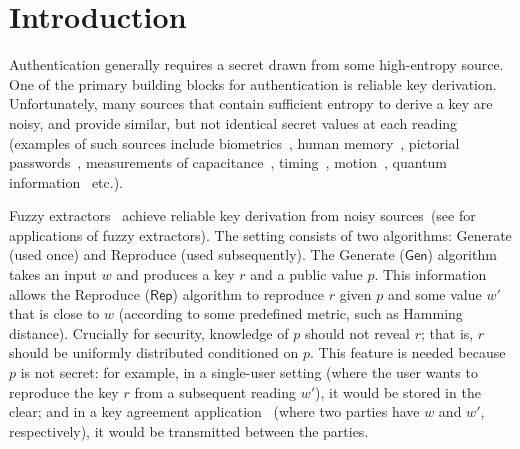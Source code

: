 \documentclass[11pt]{article}
\newcommand{\class}[1]{{\ensuremath{\mathsf{#1}}}}
\newcommand{\gen}{\ensuremath{\class{Gen}}\xspace}
\newcommand{\rep}{\ensuremath{\class{Rep}}\xspace}
\begin{document}
\newcommand{\M}{\mathcal{M}}
\section{Introduction}\label{sec:introduction}

Authentication generally requires a secret drawn from some high-entropy source.  One of the primary building blocks for authentication is reliable key derivation.  Unfortunately, many sources that contain sufficient entropy to derive a key are  noisy, and provide similar, but not identical secret values at each reading (examples of such sources include biometrics~\cite{daugman2004}, human memory~\cite{zviran1993comparison}, pictorial passwords~\cite{brostoff2000passfaces}, measurements of capacitance~\cite{tuyls2006puf}, timing~\cite{suh2007physical}, motion~\cite{castelluccia2005shake},  quantum information~\cite{bennett1988privacy} etc.).  %

Fuzzy extractors~\cite{DBLP:journals/siamcomp/DodisORS08} achieve reliable key derivation from noisy sources~(see \cite{Boyen05secureremote,dodisWichs2009,chandran2010privacy} for applications of fuzzy extractors).  The setting 
consists of  two algorithms: Generate (used once) and Reproduce (used subsequently).  The Generate ($\gen$) algorithm takes an input $w$ and produces a key $r$ and a public value $p$.  This information allows
the Reproduce ($\rep$) algorithm to reproduce $r$ given $p$ and some value $w'$ that is close to $w$ (according to some predefined metric, such as Hamming distance). 
Crucially for security,  knowledge of $p$ should not reveal $r$; that is, $r$ should be uniformly distributed conditioned on $p$.  This feature is needed because $p$ is not secret: for example, in a single-user setting (where the user wants to reproduce the key $r$ from a subsequent reading $w'$), it would be stored in the clear; and in a key agreement application~\cite{Boyen05secureremote} (where two parties have $w$ and $w'$, respectively), it would be transmitted between the parties.
\end{document}

